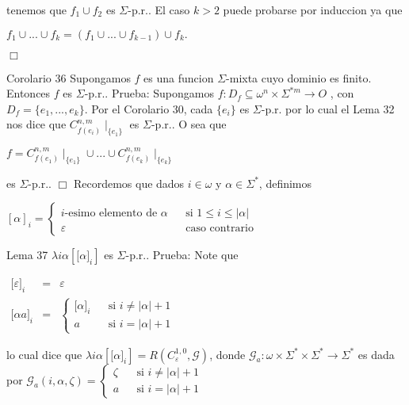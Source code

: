 tenemos que \(f_{1}\cup f_{2}\) es \(\Sigma \)-p.r..
El caso \(k >2\) puede probarse por induccion ya que

\(\displaystyle f_{1}\cup ...\cup f_{k}=(f_{1}\cup ...\cup f_{k-1})\cup f_{k}. \)

\(\Box\)


Corolario 36 Supongamos \(f\) es una funcion \(\Sigma \)-mixta cuyo dominio es finito. Entonces \(f\) es \(\Sigma \)-p.r..
Prueba: Supongamos \(f:D_{f}\subseteq \omega ^{n}\times \Sigma ^{\ast m}\rightarrow O\) , con \(D_{f}=\{e_{1},...,e_{k}\}\). Por el Corolario 30, cada \( \{e_{i}\}\) es \(\Sigma \)-p.r. por lo cual el Lema 32 nos dice que \(C_{f(e_{i})}^{n,m}\mid _{\{e_{1}\}}\) es \(\Sigma \)-p.r.. O sea que

\(\displaystyle f=C_{f(e_{1})}^{n,m}\mid _{\{e_{1}\}}\cup ...\cup C_{f(e_{k})}^{n,m}\mid _{\{e_{k}\}} \)

es \(\Sigma \)-p.r.. \(\Box\)
Recordemos que dados \(i\in \omega \) y \(\alpha \in \Sigma ^{\ast }\), definimos

\(\displaystyle \left[ \alpha \right] _{i}=\left\{ \begin{array}{lll} i\text{-esimo elemento de }\alpha & & \text{si }1\leq i\leq \left\vert \alpha \right\vert \\ \varepsilon & & \text{caso contrario} \end{array} \right. \)



Lema 37 \(\lambda i\alpha \left[ \lbrack \alpha ]_{i}\right] \) es \(\Sigma \)-p.r..
Prueba: Note que

\(\displaystyle \begin{array}{rcl} \lbrack \varepsilon ]_{i} & =& \varepsilon \\ \lbrack \alpha a]_{i} & =& \left\{ \begin{array}{lll} \lbrack \alpha ]_{i} & & \text{si }i\neq \left\vert \alpha \right\vert +1 \\ a & & \text{si }i=\left\vert \alpha \right\vert +1 \end{array} \right. \end{array} \)

lo cual dice que \(\lambda i\alpha \left[ \lbrack \alpha ]_{i}\right] =R\left( C_{\varepsilon }^{1,0},\mathcal{G}\right) \), donde \(\mathcal{G} _{a}:\omega \times \Sigma ^{\ast }\times \Sigma ^{\ast }\rightarrow \Sigma ^{\ast }\) es dada por
\(\displaystyle \mathcal{G}_{a}(i,\alpha ,\zeta )=\left\{ \begin{array}{lll} \zeta & & \text{si }i\neq \left\vert \alpha \right\vert +1 \\ a & & \text{si }i=\left\vert \alpha \right\vert +1 \end{array} \right. \)

